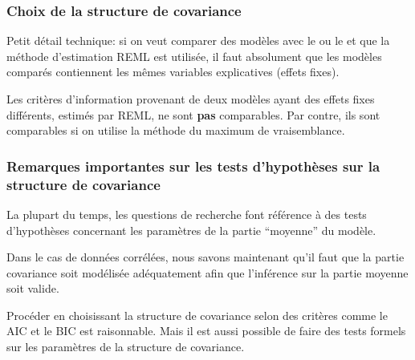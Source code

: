 \documentclass{beamer}
\begin{document}
\begin{frame}
\frametitle{Choix de la structure de covariance}
\bi
\item Petit détail technique: si on veut comparer des modèles
avec le \AIC{} ou le \BIC{} et que la méthode d'estimation REML est utilisée, il faut
absolument que les modèles comparés \alert{contiennent les mêmes variables explicatives} (effets fixes).
\item Les critères d'information provenant de
deux modèles ayant des effets fixes différents, estimés par REML, ne sont \textbf{pas} comparables. Par contre, ils sont comparables si on utilise la méthode du maximum de vraisemblance.
\ei
\end{frame}







\begin{frame}[fragile]
\frametitle{Remarques importantes sur les tests d'hypothèses sur la structure de covariance}
\bi
\item La plupart du temps, les questions de recherche font référence à des tests d'hypothèses concernant les paramètres de la partie ``moyenne'' du modèle. 
\item Dans le cas de données corrélées, nous savons maintenant qu'il faut que la partie
covariance soit modélisée adéquatement afin que l'inférence sur la partie
moyenne soit valide. 
\item Procéder en choisissant la structure de covariance selon des critères comme
le AIC et le BIC est raisonnable. Mais il est aussi possible de faire des
tests formels sur les paramètres de la structure de covariance.
\ei
\end{frame}
\end{document}
